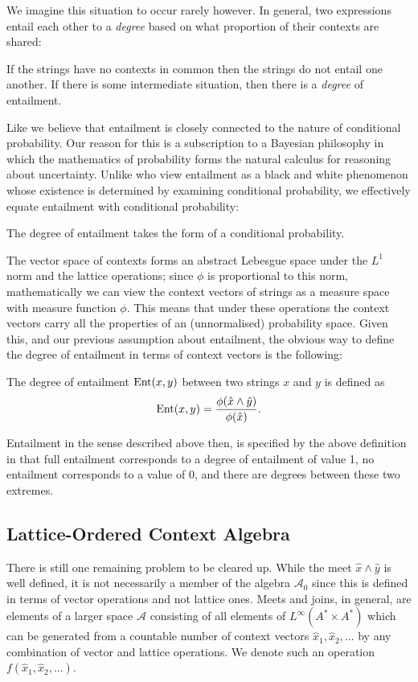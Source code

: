 \documentclass[11pt]{report}
\begin{document}
We imagine this situation to occur rarely however. In general, two expressions entail each other to a \emph{degree} based on what proportion of their contexts are shared: 
\begin{assumption}If the strings have no contexts in common then the strings do not entail one another. If there is some intermediate situation, then there is a \emph{degree} of entailment.\end{assumption}\noindent
Like \cite{Glickman:05} we believe that entailment is closely connected to the nature of conditional probability. Our reason for this is a subscription to a Bayesian philosophy in which the mathematics of probability forms the natural calculus for reasoning about uncertainty. Unlike \citeauthor{Glickman:05} who view entailment as a black and white phenomenon whose existence is determined by examining conditional probability, we effectively equate entailment with conditional probability:
\begin{assumption}
The degree of entailment takes the form of a conditional probability.
\end{assumption}
\noindent
The vector space of contexts forms an abstract Lebesgue space under the $L^1$ norm and the lattice operations; since $\phi$ is proportional to this norm, mathematically we can view the context vectors of strings as a measure space with measure function $\phi$. This means that under these operations the context vectors carry all the properties of an (unnormalised) probability space. Given this, and our previous assumption about entailment, the obvious way to define the degree of entailment in terms of context vectors is the following:
\begin{defn}
The degree of entailment $\operatorname{Ent}(x,y)$ between two strings $x$ and $y$ is defined as
$$\operatorname{Ent}(x,y) = \frac{\phi(\hat{x}\land\hat{y})}{\phi(\hat{x})}.$$
\end{defn}
Entailment in the sense described above then, is specified by the above definition in that full entailment corresponds to a degree of entailment of value 1, no entailment corresponds to a value of 0, and there are degrees between these two extremes.

\subsection{Lattice-Ordered Context Algebra}

There is still one remaining problem to be cleared up. While the meet $\hat{x} \land \hat{y}$ is well defined, it is not necessarily a member of the algebra $\mathcal{A}_0$ since this is defined in terms of vector operations and not lattice ones. Meets and joins, in general, are elements of a larger space $\mathcal{A}$ consisting of all elements of $L^\infty(A^*\times A^*)$ which can be generated from a countable number of context vectors $\hat{x}_1, \hat{x}_2, \ldots$ by any combination of vector and lattice operations. We denote such an operation $f(\hat{x}_1,\hat{x}_2,\ldots)$.
\end{document}

